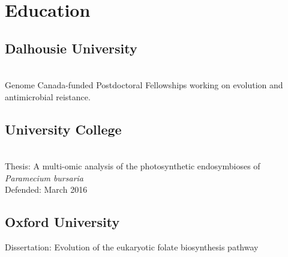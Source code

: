 \documentclass[]{Finlay_Maguire_CV}
\begin{document}
%
%
\lastupdated

%
%

%
%

\begin{minipage}[t]{0.33\textwidth} 


\section{Education} 

\subsection{Dalhousie University }
\\
Genome Canada-funded Postdoctoral Fellowships
working on evolution and antimicrobial reistance.
\sectionsep

\subsection{University College }
\\
Thesis: A multi-omic analysis of the photosynthetic endosymbioses of \textit{Paramecium bursaria} \\
Defended: March 2016 \\
\sectionsep

\subsection{Oxford University}
Dissertation: Evolution of the eukaryotic folate biosynthesis pathway\\
\sectionsep



\end{minipage}
\end{document}
